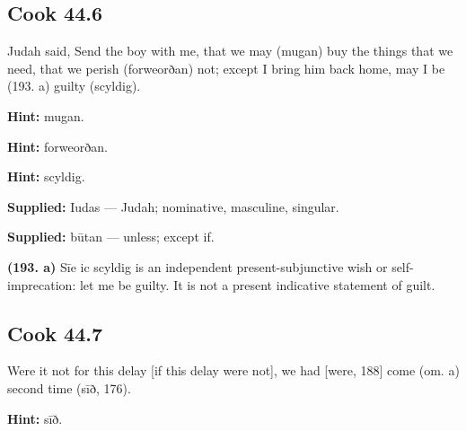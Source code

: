 \par\begin{minipage}{\linewidth}\raggedright
\subsection*{Cook 44.6}

Judah said, Send the boy with me, that we may (mugan) buy the things that we need, that we perish (forweorðan) not; except I bring him back home, may I be (193. a) guilty (scyldig).

\textbf{Hint:} mugan.

\textbf{Hint:} forweorðan.

\textbf{Hint:} scyldig.

\textbf{Supplied:} Iudas — Judah; nominative, masculine, singular.

\textbf{Supplied:} būtan — unless; except if.

\textbf{(193. a)} Sīe ic scyldig is an independent present-subjunctive wish or self-imprecation: let me be guilty. It is not a present indicative statement of guilt.

\end{minipage}\par\addvspace{4pt}

\par\begin{minipage}{\linewidth}\raggedright
\subsection*{Cook 44.7}

Were it not for this delay [if this delay were not], we had [were, 188] come (om. a) second time (sīð, 176).

\textbf{Hint:} sīð.

\end{minipage}\par\addvspace{4pt}

